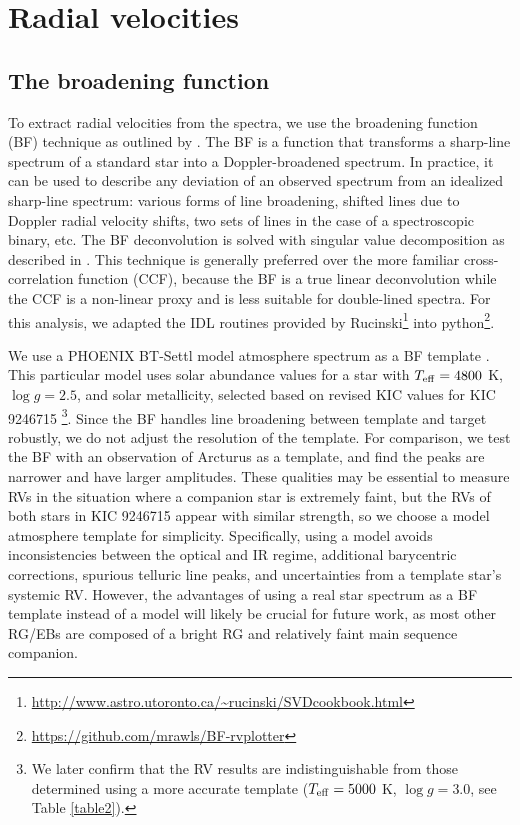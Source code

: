 \section{Radial velocities}\label{rvs}
\subsection{The broadening function}\label{bf}
To extract radial velocities from the spectra, we use the broadening function (BF) technique as outlined by \citet{ruc02}. The BF is a function that transforms a sharp-line spectrum of a standard star into a Doppler-broadened spectrum. In practice, it can be used to describe any deviation of an observed spectrum from an idealized sharp-line spectrum: various forms of line broadening, shifted lines due to Doppler radial velocity shifts, two sets of lines in the case of a spectroscopic binary, etc. The BF deconvolution is solved with singular value decomposition as described in \citet{ruc02}. This technique is generally preferred over the more familiar cross-correlation function (CCF), because the BF is a true linear deconvolution while the CCF is a non-linear proxy and is less suitable for double-lined spectra. For this analysis, we adapted the IDL routines provided by Rucinski\footnote{\url{http://www.astro.utoronto.ca/~rucinski/SVDcookbook.html}} into python\footnote{\url{https://github.com/mrawls/BF-rvplotter}}.

We use a PHOENIX BT-Settl model atmosphere spectrum as a BF template \citep{all03}. This particular model uses \citet{asp09} solar abundance values for a star with $T_{\rm{eff}} = 4800$ K, $\log g = 2.5$, and solar metallicity, selected based on revised KIC values for KIC 9246715 \citep{hub14.2}\footnote{We later confirm that the RV results are indistinguishable from those determined using a more accurate template ($T_{\rm{eff}} = 5000$ K, $\log g = 3.0$, see Table \ref{table2}).}. Since the BF handles line broadening between template and target robustly, we do not adjust the resolution of the template. For comparison, we test the BF with an observation of Arcturus as a template, and find the peaks are narrower and have larger amplitudes. These qualities may be essential to measure RVs in the situation where a companion star is extremely faint, but the RVs of both stars in KIC 9246715 appear with similar strength, so we choose a model atmosphere template for simplicity. Specifically, using a model avoids inconsistencies between the optical and IR regime, additional barycentric corrections, spurious telluric line peaks, and uncertainties from a template star's systemic RV. However, the advantages of using a real star spectrum as a BF template instead of a model will likely be crucial for future work, as most other RG/EBs are composed of a bright RG and relatively faint main sequence companion.

